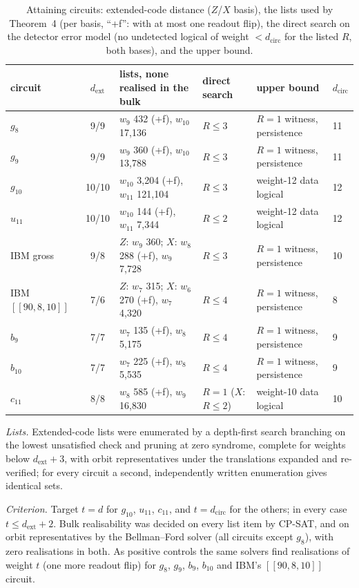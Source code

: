 \documentclass[aps,prl,twocolumn,superscriptaddress,nofootinbib]{revtex4-2}
\newcommand{\dcirc}{d_{\mathrm{circ}}}
\newcommand{\dext}{d_{\mathrm{ext}}}
\newcommand{\code}[1]{[[#1]]}
\begin{document}
\begin{table}[h]
\caption{Attaining circuits: extended-code distance ($Z$/$X$ basis), the lists used by
Theorem~4 (per basis, ``+f'': with at most one readout flip), the direct search on the
detector error model (no undetected logical of weight $<\dcirc$ for the listed $R$, both
bases), and the upper bound.}
\label{tab:attain}
\begin{ruledtabular}
\begin{tabular}{lcllll}
circuit & $\dext$ & lists, none realised in the bulk & direct search & upper bound & $\dcirc$\\
\hline
$g_8$ & 9/9 & $w_9$ 432 (+f), $w_{10}$ 17,136 & $R\le3$ & $R=1$ witness, persistence & 11\\
$g_9$ & 9/9 & $w_9$ 360 (+f), $w_{10}$ 13,788 & $R\le3$ & $R=1$ witness, persistence & 11\\
$g_{10}$ & 10/10 & $w_{10}$ 3,204 (+f), $w_{11}$ 121,104 & $R\le3$ & weight-12 data logical & 12\\
$u_{11}$ & 10/10 & $w_{10}$ 144 (+f), $w_{11}$ 7,344 & $R\le2$ & weight-12 data logical & 12\\
IBM gross & 9/8 & $Z$: $w_9$ 360; $X$: $w_8$ 288 (+f), $w_9$ 7,728 & $R\le3$ & $R=1$ witness, persistence & 10\\
IBM $\code{90,8,10}$ & 7/6 & $Z$: $w_7$ 315; $X$: $w_6$ 270 (+f), $w_7$ 4,320 & $R\le4$ & $R=1$ witness, persistence & 8\\
$b_9$ & 7/7 & $w_7$ 135 (+f), $w_8$ 5,175 & $R\le4$ & $R=1$ witness, persistence & 9\\
$b_{10}$ & 7/7 & $w_7$ 225 (+f), $w_8$ 5,535 & $R\le4$ & $R=1$ witness, persistence & 9\\
$c_{11}$ & 8/8 & $w_8$ 585 (+f), $w_9$ 16,830 & $R=1$ ($X$: $R\le2$) & weight-10 data logical & 10\\
\end{tabular}
\end{ruledtabular}
\end{table}

\emph{Lists.} Extended-code lists were enumerated by a depth-first search branching on the
lowest unsatisfied check and pruning at zero syndrome, complete for weights below
$\dext+3$, with orbit representatives under the translations expanded and re-verified; for
every circuit a second, independently written enumeration gives identical sets.

\emph{Criterion.} Target $t=d$ for $g_{10}$, $u_{11}$, $c_{11}$, and $t=\dcirc$ for the
others; in every case $t\le\dext+2$. Bulk realisability was decided on every list item by
CP-SAT, and on orbit representatives by the Bellman--Ford solver (all circuits except $g_8$), with
zero realisations in both. As positive controls the same solvers find realisations of weight $t$ (one more
readout flip) for $g_8$, $g_9$, $b_9$, $b_{10}$ and IBM's $\code{90,8,10}$ circuit.
\end{document}
